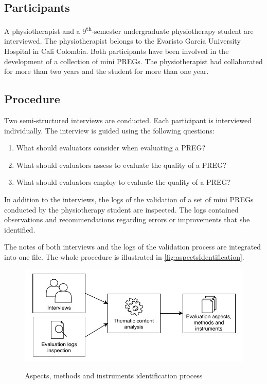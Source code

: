 \subsection{Participants}
A physiotherapist and a 9\textsuperscript{th}-semester undergraduate physiotherapy student are interviewed. The physiotherapist belongs to the Evaristo Garc\'ia University Hospital in Cali Colombia. Both participants have been involved in the development of a collection of mini \acp{PREG}. The physiotherapist had collaborated for more than two years and the student for more than one year.

\subsection{Procedure}
Two semi-structured interviews are conducted. Each participant is interviewed individually. The interview is guided using the following questions:

\begin{enumerate}
    \item What should evaluators consider when evaluating a \ac{PREG}?
    \item What should evaluators assess to evaluate the quality of a \ac{PREG}?
    \item What should evaluators employ to evaluate the quality of a \ac{PREG}?
\end{enumerate}

In addition to the interviews, the logs of the validation of a set of mini \acp{PREG} conducted by the physiotherapy student are inspected. The logs contained observations and recommendations regarding errors or improvements that she identified.

The notes of both interviews and the logs of the validation process are integrated into one file. The whole procedure is illustrated in \autoref{fig:aspectsIdentification}.

\begin{figure}[htb]
\myfloatalign
{\includegraphics[width=\linewidth]{gfx/aspects/aspectsIdentification}} \quad
\caption{Aspects, methods and instruments identification process}\label{fig:aspectsIdentification}
\end{figure}

